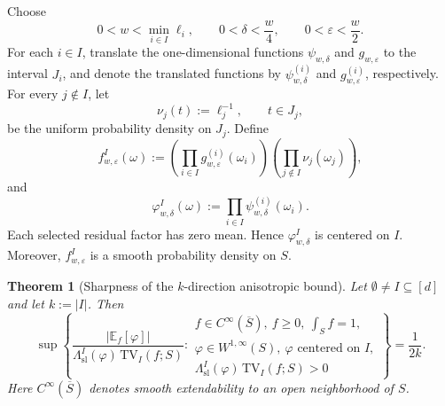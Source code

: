 \documentclass[11pt,letterpaper]{article}
\newtheorem{theorem}{Theorem}[section]
\theoremstyle{definition}
\theoremstyle{remark}
\newcommand{\TV}{\mathrm{TV}}
\begin{document}
Choose
$$
0<w<\min_{i\in I}\ell_i,
\qquad
0<\delta<\frac{w}{4},
\qquad
0<\varepsilon<\frac{w}{2}.
$$
For each $i\in I$, translate the one-dimensional functions
$\psi_{w,\delta}$ and $g_{w,\varepsilon}$ to the interval $J_i$, and denote
the translated functions by
$\psi_{w,\delta}^{(i)}$ and $g_{w,\varepsilon}^{(i)}$, respectively.
For every $j\notin I$, let
$$
\nu_j(t):=\ell_j^{-1},
\qquad t\in J_j,
$$
be the uniform probability density on $J_j$. Define
\begin{equation}
\label{eq:appendix_tensorized_tv_sharpness_pair}
f_{w,\varepsilon}^I(\omega)
:=
\left(
\prod_{i\in I}
g_{w,\varepsilon}^{(i)}(\omega_i)
\right)
\left(
\prod_{j\notin I}
\nu_j(\omega_j)
\right),
\end{equation}
and
\begin{equation}
\label{eq:appendix_tensorized_tv_sharpness_residual}
\varphi_{w,\delta}^I(\omega)
:=
\prod_{i\in I}
\psi_{w,\delta}^{(i)}(\omega_i).
\end{equation}
Each selected residual factor has zero mean. Hence
$\varphi_{w,\delta}^I$ is centered on $I$. Moreover,
$f_{w,\varepsilon}^I$ is a smooth probability density on $S$.

\begin{theorem}[Sharpness of the $k$-direction anisotropic bound]
\label{thm:appendix_k_direction_tv_sharpness}
Let $\emptyset\neq I\subseteq[d]$ and let $k:=|I|$. Then
\begin{equation}
\label{eq:appendix_tv_sharpness_supremum}
\sup
\left\{
\frac{|\mathbb E_f[\varphi]|}
{\Lambda_{\mathrm{sl}}^I(\varphi)\,\TV_I(f;S)}
:
\begin{array}{l}
f\in C^\infty(\overline S),\
f\ge0,\
\displaystyle\int_S f=1,
\\[1mm]
\varphi\in W^{1,\infty}(S),\
\varphi\text{ centered on }I,
\\[1mm]
\Lambda_{\mathrm{sl}}^I(\varphi)\,\TV_I(f;S)>0
\end{array}
\right\}
=
\frac{1}{2k}.
\end{equation}
Here $C^\infty(\overline S)$ denotes smooth extendability to an open
neighborhood of $S$.
\end{theorem}
\end{document}
